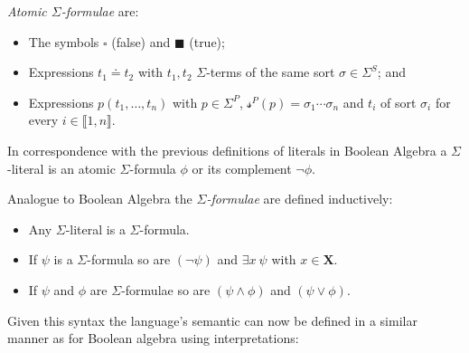 \begin{definition}
\textit{Atomic $\Sigma$-formulae} are:
\begin{itemize}
    \item The symbols $\square$ (false) and $\blacksquare$ (true);
    \item Expressions $t_1 \doteq t_2$ with $t_1, t_2$ $\Sigma$-terms of the same sort $\sigma\in\Sigma^S$; and
    \item Expressions $p\left(t_1,\dots,t_n\right)$ with $p\in\Sigma^P$, $\mathcal{s}^P(p)=\sigma_1\dotsi\sigma_n$ and $t_i$ of sort $\sigma_i$ for every $i\in\llbracket1,n\rrbracket$.
\end{itemize}
In correspondence with the previous definitions of literals in Boolean Algebra a $\Sigma$-literal is an atomic $\Sigma$-formula $\phi$ or its complement $\neg\phi$.
\end{definition}

\begin{definition}
Analogue to Boolean Algebra the \textit{$\Sigma$-formulae} are defined inductively:
\begin{itemize}
    \item Any $\Sigma$-literal is a $\Sigma$-formula.
    \item If $\psi$ is a $\Sigma$-formula so are $\left(\neg\psi\right)$ and $\exists x\ \psi$ with $x\in\mathbf{X}$.
    \item If $\psi$ and $\phi$ are $\Sigma$-formulae so are $\left(\psi\land\phi\right)$ and $\left(\psi\lor\phi\right)$.
\end{itemize}
\end{definition}

Given this syntax the language's semantic can now be defined in a similar manner as for Boolean algebra using interpretations:


